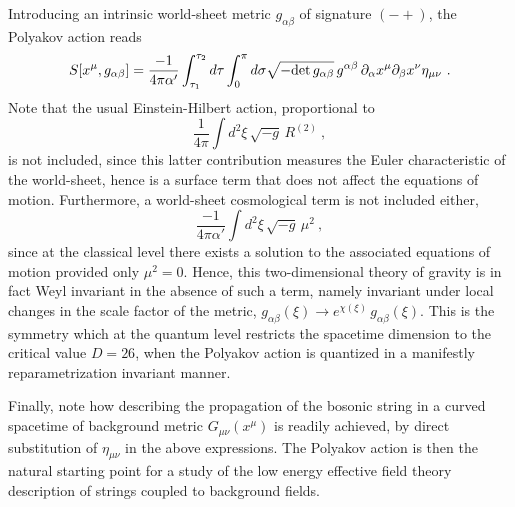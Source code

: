 \documentclass[a4paper,11pt]{article}
\begin{document}
Introducing an intrinsic world-sheet metric $g_{\alpha\beta}$ of
signature $(-+)$, the Polyakov action reads
\begin{equation}
S[x^\mu,g_{\alpha\beta}]=\frac{-1}{4\pi\alpha'}
\int_{\tau_1}^{\tau_2}d\tau\int_0^\pi d\sigma\sqrt{-{\rm det}\,
g_{\alpha\beta}}\,g^{\alpha\beta}\,\partial_\alpha x^\mu\partial_\beta x^\nu
\eta_{\mu\nu}\ .
\end{equation}
Note that the usual Einstein-Hilbert action, proportional to
\begin{equation}
\frac{1}{4\pi}\int d^2\xi\,\sqrt{-g}\,R^{(2)}\ ,
\end{equation}
is not included, since this latter contribution measures the Euler 
characteristic of the world-sheet, hence is a surface term that does not
affect the equations of motion. Furthermore, a world-sheet cosmological
term is not included either,
\begin{equation}
\frac{-1}{4\pi\alpha'}\int d^2\xi\,\sqrt{-g}\,\mu^2\ ,
\end{equation}
since at the classical level there exists a solution to the associated
equations of motion provided only $\mu^2=0$. Hence, this two-dimensional 
theory of gravity is in fact Weyl invariant in the absence of such a term, 
namely invariant under local changes in the scale factor of the metric,
$g_{\alpha\beta}(\xi)\rightarrow e^{\chi(\xi)}\,g_{\alpha\beta}(\xi)$.
This is the symmetry which at the quantum level restricts
the spacetime dimension to the critical value $D=26$, when the Polyakov action
is quantized in a manifestly reparametrization invariant 
manner.\cite{Pol,GSW,JG10,JG11}

Finally, note how describing the propagation of the bosonic string
in a curved spacetime of background metric $G_{\mu\nu}(x^\mu)$ is
readily achieved, by direct substitution of $\eta_{\mu\nu}$ in the above
expressions. The Polyakov action is then the natural starting point
for a study of the low energy effective field theory description of
strings coupled to background fields.\cite{Pol,GSW}

\vspace{10pt}
\end{document}
